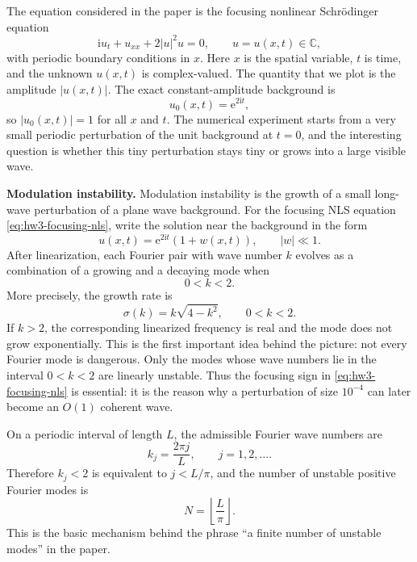 \documentclass{amsart}
\newcounter{hw}
\newcounter{note}
\numberwithin{equation}{hw}
\newcommand{\noteheading}[1]{\vspace{1em}\noindent\textbf{#1}}
\begin{document}
The equation considered in the paper is the focusing nonlinear
Schr\"odinger equation
\begin{equation}
\mathrm{i}u_t+u_{xx}+2|u|^2u=0,
\qquad
u=u(x,t)\in\mathbb{C},
\label{eq:hw3-focusing-nls}
\end{equation}
with periodic boundary conditions in \(x\).  Here \(x\) is the spatial
variable, \(t\) is time, and the unknown \(u(x,t)\) is complex-valued.
The quantity that we plot is the amplitude \(|u(x,t)|\).  The exact
constant-amplitude background is
\begin{equation}
u_0(x,t)=\mathrm{e}^{2\mathrm{i}t},
\label{eq:hw3-background}
\end{equation}
so \(|u_0(x,t)|=1\) for all \(x\) and \(t\).  The numerical experiment
starts from a very small periodic perturbation of the unit background at
\(t=0\), and the interesting question is whether this tiny perturbation
stays tiny or grows into a large visible wave.

\noteheading{Modulation instability.}
Modulation instability is the growth of a small long-wave perturbation of
a plane wave background.  For the focusing NLS equation
\eqref{eq:hw3-focusing-nls}, write the solution near the background in
the form
\begin{equation}
u(x,t)
=
\mathrm{e}^{2\mathrm{i}t}
\left(1+w(x,t)\right),
\qquad
|w|\ll1.
\label{eq:hw3-linearization-ansatz}
\end{equation}
After linearization, each Fourier pair with wave number \(k\) evolves as
a combination of a growing and a decaying mode when
\begin{equation}
0<k<2.
\label{eq:hw3-unstable-band}
\end{equation}
More precisely, the growth rate is
\begin{equation}
\sigma(k)
=
k\sqrt{4-k^2},
\qquad
0<k<2.
\label{eq:hw3-growth-rate}
\end{equation}
If \(k>2\), the corresponding linearized frequency is real and the mode
does not grow exponentially.  This is the first important idea behind the
picture: not every Fourier mode is dangerous.  Only the modes whose wave
numbers lie in the interval \(0<k<2\) are linearly unstable.  Thus the
focusing sign in \eqref{eq:hw3-focusing-nls} is essential: it is the
reason why a perturbation of size \(10^{-4}\) can later become an
\(O(1)\) coherent wave.

On a periodic interval of length \(L\), the admissible Fourier wave
numbers are
\begin{equation}
k_j=\frac{2\pi j}{L},
\qquad
j=1,2,\ldots .
\label{eq:hw3-fourier-modes}
\end{equation}
Therefore \(k_j<2\) is equivalent to \(j<L/\pi\), and the number of
unstable positive Fourier modes is
\begin{equation}
N
=
\left\lfloor \frac{L}{\pi}\right\rfloor .
\label{eq:hw3-number-unstable-modes}
\end{equation}
This is the basic mechanism behind the phrase ``a finite number of
unstable modes'' in the paper.
\end{document}
